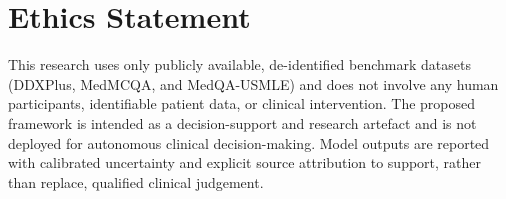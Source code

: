 \section*{Ethics Statement}

This research uses only publicly available, de-identified benchmark datasets (DDXPlus, MedMCQA, and MedQA-USMLE) and does not involve any human participants, identifiable patient data, or clinical intervention. The proposed framework is intended as a decision-support and research artefact and is not deployed for autonomous clinical decision-making. Model outputs are reported with calibrated uncertainty and explicit source attribution to support, rather than replace, qualified clinical judgement.

